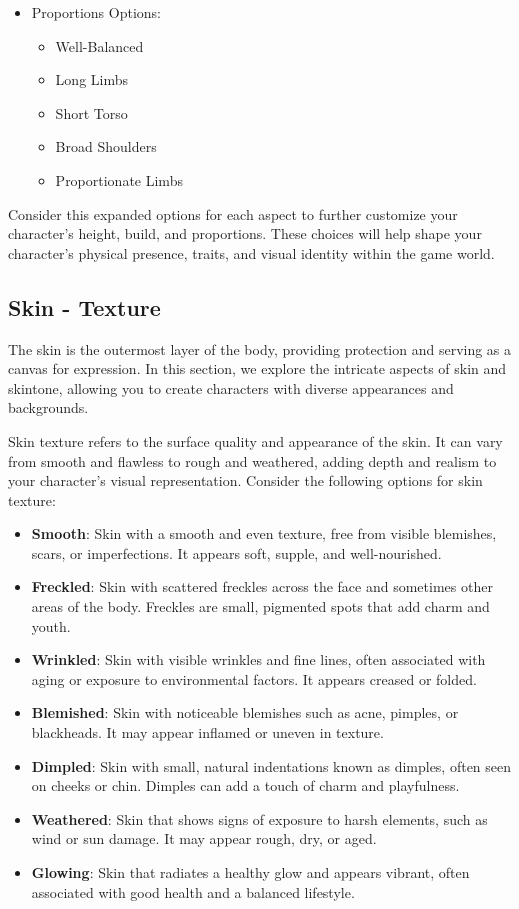 \documentclass[12pt]{book}  %
\begin{document}
\begin{itemize}
    \item Proportions Options:
    \begin{itemize}
        \item Well-Balanced
        \item Long Limbs
        \item Short Torso
        \item Broad Shoulders
        \item Proportionate Limbs
    \end{itemize}
\end{itemize}

Consider this expanded options for each aspect to further customize your character's height, build, and proportions. These choices will help shape your character's physical presence, traits, and visual identity within the game world.

\subsection{\textbf{Skin  - Texture}}

The skin is the outermost layer of the body, providing protection and serving as a canvas for expression. In this section, we explore the intricate aspects of skin and skintone, allowing you to create characters with diverse appearances and backgrounds.

Skin texture refers to the surface quality and appearance of the skin. It can vary from smooth and flawless to rough and weathered, adding depth and realism to your character's visual representation. Consider the following options for skin texture:

\begin{itemize}
    \item \textbf{Smooth}: Skin with a smooth and even texture, free from visible blemishes, scars, or imperfections. It appears soft, supple, and well-nourished.
    \item \textbf{Freckled}: Skin with scattered freckles across the face and sometimes other areas of the body. Freckles are small, pigmented spots that add charm and youth.
    \item \textbf{Wrinkled}: Skin with visible wrinkles and fine lines, often associated with aging or exposure to environmental factors. It appears creased or folded.
    \item \textbf{Blemished}: Skin with noticeable blemishes such as acne, pimples, or blackheads. It may appear inflamed or uneven in texture.
    \item \textbf{Dimpled}: Skin with small, natural indentations known as dimples, often seen on cheeks or chin. Dimples can add a touch of charm and playfulness.
    \item \textbf{Weathered}: Skin that shows signs of exposure to harsh elements, such as wind or sun damage. It may appear rough, dry, or aged.
    \item \textbf{Glowing}: Skin that radiates a healthy glow and appears vibrant, often associated with good health and a balanced lifestyle.
\end{itemize}
\end{document}
